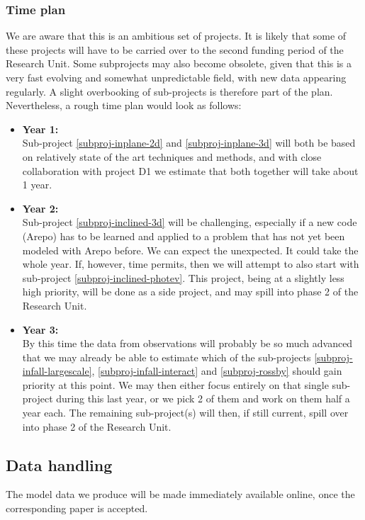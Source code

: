\documentclass[10pt,fleqn,twoside]{article}
\begin{document}
\subsubsection{Time plan}
We are aware that this is an ambitious set of projects. It is likely that
some of these projects will have to be carried over to the second funding
period of the Research Unit. Some subprojects may also become obsolete,
given that this is a very fast evolving and somewhat unpredictable field,
with new data appearing regularly. A slight overbooking of sub-projects is
therefore part of the plan. Nevertheless, a rough time plan would look as
follows:
\begin{itemize}
\item {\bf Year 1:}\\
  Sub-project \ref{subproj-inplane-2d} and \ref{subproj-inplane-3d} will both
  be based on relatively state of the art techniques and methods, and with
  close collaboration with project D1 we estimate that both together will
  take about 1 year.
\item {\bf Year 2:}\\
  Sub-project \ref{subproj-inclined-3d} will be challenging, especially if a
  new code (Arepo) has to be learned and applied to a problem that has not yet
  been modeled with Arepo before. We can expect the unexpected. It could take
  the whole year. If, however, time permits, then we will attempt to also 
  start with sub-project \ref{subproj-inclined-photev}. This project, being at a
  slightly less high priority, will be done as a side project, and may spill into
  phase 2 of the Research Unit.
\item {\bf Year 3:}\\
  By this time the data from observations will probably be so much advanced
  that we may already be able to estimate which of the sub-projects
  \ref{subproj-infall-largescale}, \ref{subproj-infall-interact} and \ref{subproj-rossby}
  should gain priority at this point. We may then either focus entirely on
  that single sub-project during this last year, or we pick 2 of them and
  work on them half a year each. The remaining sub-project(s) will then, if
  still current, spill over into phase 2 of the Research Unit.
\end{itemize}


\subsection{Data handling}
The model data we produce will be made immediately available online, once
the corresponding paper is accepted. 
\end{document}
